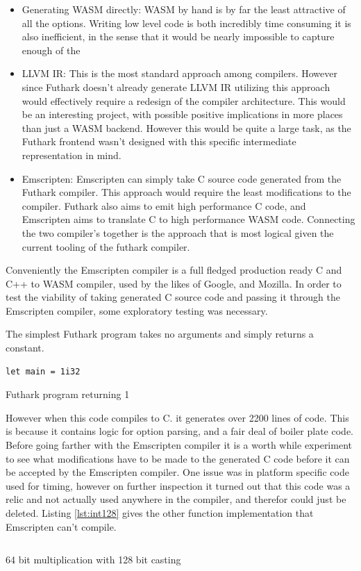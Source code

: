 \documentclass[11pt]{book}
\begin{document}
\begin{itemize}
    \item Generating WASM directly: 
        WASM by hand is by far the least attractive of all the options. Writing low level code is both incredibly time consuming it is also inefficient, in the sense that it would be nearly impossible to capture enough of the  
    \item LLVM IR: This is the most standard approach among compilers. However since Futhark doesn't already generate LLVM IR utilizing this approach would effectively require a redesign of the compiler architecture. This would be an interesting project, with possible positive implications in more places than just a WASM backend. However this would be quite a large task, as the Futhark frontend wasn't designed with this specific intermediate representation in mind. 
    \item Emscripten: Emscripten can simply take C source code generated from the Futhark compiler. This approach would require the least modifications to the compiler. Futhark also aims to emit high performance C code, and Emscripten aims to translate C to high performance WASM code. Connecting the two compiler's together is the approach that is most logical given the current tooling of the futhark compiler.
\end{itemize}

Conveniently the Emscripten compiler is a full fledged production ready C and C++ to WASM compiler, used by the likes of Google, and Mozilla. In order to test the viability of taking generated C source code and passing it through the Emscripten compiler, some exploratory testing was necessary.

The simplest Futhark program takes no arguments and simply returns a constant. 
\begin{listing}[H]
\begin{verbatim}
let main = 1i32
\end{verbatim}
\caption{Futhark program returning 1}
\label{lst:simp}
\end{listing}



However when this code compiles to C. it generates over 2200 lines of code. This is because it contains logic for option parsing, and a fair deal of boiler plate code. Before going farther with the Emscripten compiler it is a worth while experiment to see what modifications have to be made to the generated C code before it can be accepted by the Emscripten compiler. One issue was in platform specific code used for timing, however on further inspection it turned out that this code was a relic and not actually used anywhere in the compiler, and therefor could just be deleted. Listing \ref{lst:int128} gives the other function implementation that Emscripten can't compile.
\begin{listing}[H] 
        \inputminted[fontsize=\small,baselinestretch=0.5,linenos]{C}{code/compiler/int128_c.c}
        \caption{64 bit multiplication with 128 bit casting}
        \label{lst:int128}    
\end{listing} 
\end{document}
